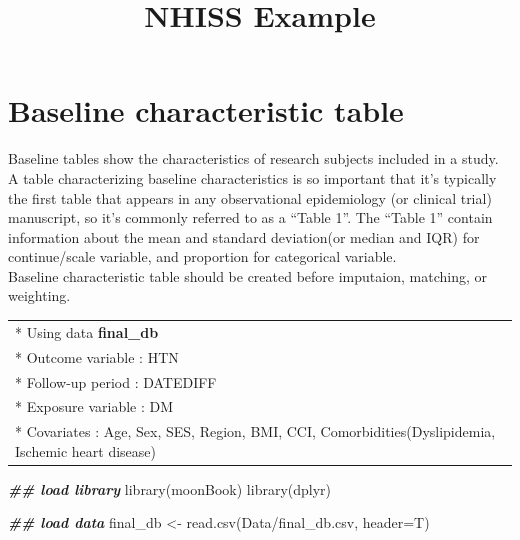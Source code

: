 \documentclass[
]{book}
\title{NHISS Example}
\author{}
\date{\vspace{-2.5em}}
\newenvironment{Shaded}{\begin{snugshade}}{\end{snugshade}}
\newcommand{\AttributeTok}[1]{\textcolor[rgb]{0.77,0.63,0.00}{#1}}
\newcommand{\DocumentationTok}[1]{\textcolor[rgb]{0.56,0.35,0.01}{\textbf{\textit{#1}}}}
\newcommand{\FunctionTok}[1]{\textcolor[rgb]{0.00,0.00,0.00}{#1}}
\newcommand{\NormalTok}[1]{#1}
\newcommand{\OtherTok}[1]{\textcolor[rgb]{0.56,0.35,0.01}{#1}}
\newcommand{\StringTok}[1]{\textcolor[rgb]{0.31,0.60,0.02}{#1}}
\theoremstyle{definition}
\theoremstyle{definition}
\theoremstyle{definition}
\theoremstyle{definition}
\theoremstyle{remark}
\begin{document}
\maketitle

{
\setcounter{tocdepth}{1}
\tableofcontents
}
\hypertarget{baseline-characteristic-table}{%
\chapter{Baseline characteristic table}\label{baseline-characteristic-table}}

Baseline tables show the characteristics of research subjects included in a study. A table characterizing baseline characteristics is so important that it's typically the first table that appears in any observational epidemiology (or clinical trial) manuscript, so it's commonly referred to as a ``Table 1''. The ``Table 1'' contain information about the mean and standard deviation(or median and IQR) for continue/scale variable, and proportion for categorical variable.\\
Baseline characteristic table should be created before imputaion, matching, or weighting.

\begin{longtable}[]{@{}l@{}}
\toprule()
\endhead
* Using data \textbf{final\_db} \\
* Outcome variable : HTN \\
* Follow-up period : DATEDIFF \\
* Exposure variable : DM \\
* Covariates : Age, Sex, SES, Region, BMI, CCI, Comorbidities(Dyslipidemia, Ischemic heart disease) \\
\bottomrule()
\end{longtable}

\begin{Shaded}
\begin{Highlighting}[]
\DocumentationTok{\#\# load library}
\FunctionTok{library}\NormalTok{(moonBook)}
\FunctionTok{library}\NormalTok{(dplyr)}
\end{Highlighting}
\end{Shaded}

\begin{Shaded}
\begin{Highlighting}[]
\DocumentationTok{\#\# load data}
\NormalTok{final\_db }\OtherTok{\textless{}{-}} \FunctionTok{read.csv}\NormalTok{(}\StringTok{\textquotesingle{}Data/final\_db.csv\textquotesingle{}}\NormalTok{, }\AttributeTok{header=}\NormalTok{T)}
\end{Highlighting}
\end{Shaded}
\end{document}
